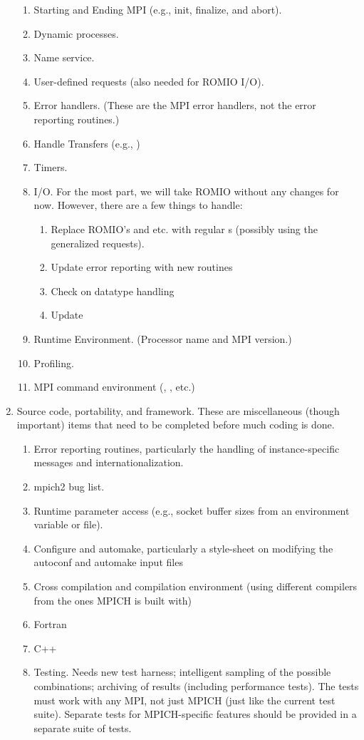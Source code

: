 \documentclass{article}
\begin{document}
\begin{enumerate}
\begin{enumerate}
  \item Starting and Ending MPI (e.g., init, finalize, and abort).
  \item Dynamic processes.
  \item Name service.
  \item User-defined requests (also needed for ROMIO I/O).
  \item Error handlers. (These are the MPI error handlers, not the error
    reporting routines.)
  \item Handle Transfers (e.g., )
  \item Timers.
  \item I/O.  For the most part, we will take ROMIO without any changes for
    now.  However, there are a few things to handle:
    \begin{enumerate}
    \item Replace ROMIO's  and  etc. with
      regular s (possibly using the generalized requests).
    \item Update error reporting with new routines
    \item Check on datatype handling
    \item Update 
    \end{enumerate}
  \item Runtime Environment.  (Processor name and MPI version.)
  \item Profiling.
  \item MPI command environment (, , etc.)
  \end{enumerate}
\item Source code, portability, and framework.
  These are miscellaneous (though important) items that need to be completed
  before much coding is done.

  \begin{enumerate}
  \item Error reporting routines, particularly the handling of
    instance-specific messages and internationalization.
  \item mpich2 bug list.
  \item Runtime parameter access (e.g., socket buffer sizes from an
    environment variable or  file).
  \item Configure and automake, particularly a style-sheet on modifying the
    autoconf and automake input files
  \item Cross compilation and compilation environment (using different
    compilers from the ones MPICH is built with)
  \item Fortran
  \item C++
  \item Testing.  Needs new test harness; intelligent sampling of the possible
    combinations; archiving of results (including performance tests).  The
    tests must work with any MPI, not just MPICH (just like the current test
    suite).  Separate tests for MPICH-specific features should be provided in
    a separate suite of tests.
  \end{enumerate}
\end{enumerate}
\end{document}
